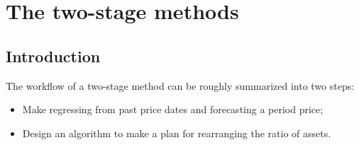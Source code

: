 \documentclass{mcmthesis}
\begin{document}






\section{The two-stage methods}

\subsection{Introduction}

The workflow of a two-stage method can be roughly summarized into two steps:

\begin{itemize}
  \item Make regressing from past price dates and forecasting a period price;
  \item Design an algorithm to make a plan for rearranging the ratio of assets.
\end{itemize}
\end{document}
